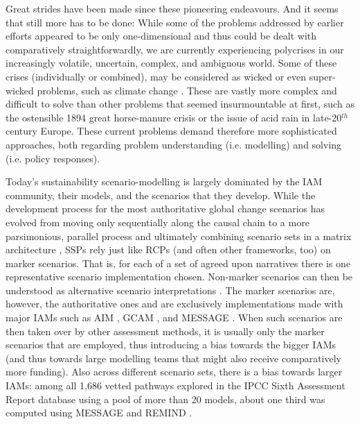 \documentclass{article}
\begin{document}
\begin{refsection}
Great strides have been made since these pioneering endeavours. And it seems that still more has to be done: While some of the problems addressed by earlier efforts appeared to be only one-dimensional and thus could be dealt with comparatively straightforwardly, we are currently experiencing polycrises in our increasingly volatile, uncertain, complex, and ambiguous world. Some of these crises (individually or combined), may be considered as wicked \parencite{rittel_1973, termeer_2019,lonngren_2021} or even super-wicked problems, such as climate change \parencite{levin_2012}. These are vastly more complex and difficult to solve than other problems that seemed insurmountable at first, such as the ostensible 1894 great horse-manure crisis or the issue of acid rain in late-20$^{th}$ century Europe. These current problems demand therefore more sophisticated approaches, both regarding problem understanding (i.e. modelling) and solving (i.e. policy responses). 

Today's sustainability scenario-modelling is largely dominated by the IAM community, their models, and the scenarios that they develop. While the development process for the most authoritative global change scenarios has evolved from moving only sequentially along the causal chain to a more parsimonious, parallel process \parencite{moss_2010} and ultimately combining scenario sets in a matrix architecture \parencite{vanvuuren_2014},\footnotemark{} SSPs rely just like RCPs (and often other frameworks, too) on marker scenarios. That is, for each of a set of agreed upon narratives there is one representative scenario implementation chosen. Non-marker scenarios can then be understood as alternative scenario interpretations \parencite{riahi_2017}. The marker scenarios are, however, the authoritative ones and are exclusively implementations made with major IAMs such as AIM \parencite{fujimori_2017}, GCAM \parencite{calvin_2017}, and MESSAGE \parencite{fricko_20171}. When such scenarios are then taken over by other assessment methods, it is usually only the marker scenarios that are employed, thus introducing a bias towards the bigger IAMs (and thus towards large modelling teams that might also receive comparatively more funding). Also across different scenario sets, there is a bias towards larger IAMs: among all 1,686 vetted pathways explored in the IPCC Sixth Assessment Report database using a pool of more than 20 models, about one third was computed using MESSAGE and REMIND \parencite{gambhir_2022,byers_2022}.



\end{refsection}
\end{document}
